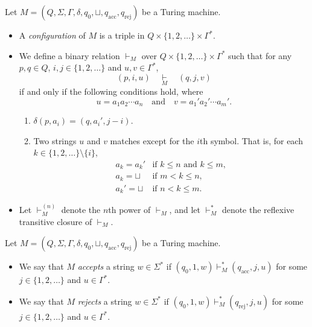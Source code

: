 \begin{definition}
  Let $M = (Q, \Sigma, \Gamma, \delta, q_0, \sqcup, q_\text{acc},
  q_\text{rej})$ be a Turing machine.
  \begin{itemize}
    \item A \emph{configuration} of $M$ is a triple in $Q \times \{1, 2,
    \dots\} \times \Gamma^*$.
    \item We define a binary relation $\vdash_M$ over $Q \times \{1, 2, \dots\}
    \times \Gamma^*$ such that for any $p, q \in Q$, $i, j \in \{1, 2, \dots
    \}$ and $u, v \in \Gamma^*$,
    \begin{equation*}
      (p, i, u)
      \quad \mathop\vdash\limits_{M} \quad
      (q, j, v)
    \end{equation*}
    if and only if the following conditions hold, where
    \begin{equation*}
      u = a_1a_2 \cdots a_n
      \quad \text{and} \quad
      v = a_1'a_2' \cdots a_m'.
    \end{equation*}
    \begin{enumerate}[1.]
      \item $\delta(p, a_i) = (q, a_i', j - i)$.
      \item Two strings $u$ and $v$ matches except for the $i$th symbol.
      That is, for each $k \in \{1, 2, \dots\} \setminus \{i\}$,
      \begin{equation*}
        \begin{array}{ll}
          a_k = a_k' & \text{if $k \leq n$ and $k \leq m$}, \\[.3em]
          a_k = \sqcup & \text{if $m < k \leq n$}, \\[.3em]
          a_k' = \sqcup & \text{if $n < k \leq m$}.
        \end{array}
      \end{equation*}
    \end{enumerate}
    \item Let $\vdash_M^{(n)}$ denote the $n$th power of $\vdash_M$, and let
    $\vdash_M^*$ denote the reflexive transitive closure of $\vdash_M$.
  \end{itemize}
\end{definition}

\begin{definition}
  Let $M = (Q, \Sigma, \Gamma, \delta, q_0, \sqcup, q_\text{acc},
  q_\text{rej})$ be a Turing machine.
  \begin{itemize}
    \item We say that $M$ \emph{accepts} a string $w \in \Sigma^*$ if $(q_0, 1,
    w) \vdash_M^* (q_\text{acc}, j, u)$ for some $j \in \{1, 2, \dots\}$ and
    $u \in \Gamma^*$.
    \item We say that $M$ \emph{rejects} a string $w \in \Sigma^*$ if $(q_0, 1,
    w) \vdash_M^* (q_\text{rej}, j, u)$ for some $j \in \{1, 2, \dots\}$ and
    $u \in \Gamma^*$.
  \end{itemize}
\end{definition}

